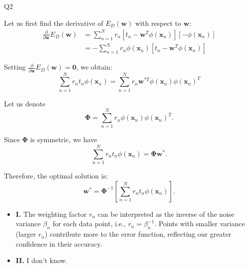 \question Q2\droppoints

\begin{solution}
     Let us first find the derivative of $E_D(\mathbf{w})$ with respect to $\mathbf{w}$:
    \begin{align*}
        \frac{\partial}{\partial \mathbf{w}} E_D(\mathbf{w})
        &= \sum_{n = 1}^{N} r_n \left[ t_n - \mathbf{w}^T\phi(\mathbf{x}_n) \right] \left[ -\phi(\mathbf{x}_n) \right] \\[0.5em]
        &= -\sum_{n = 1}^{N} r_n \phi(\mathbf{x}_n) \left[ t_n - \mathbf{w}^T\phi(\mathbf{x}_n) \right]
    \end{align*}

    Setting $\frac{\partial}{\partial \mathbf{w}}E_D(\mathbf{w}) = \mathbf{0}$, we obtain:
    \[
        \sum_{n = 1}^{N} r_n t_n \phi(\mathbf{x}_n)
        = \sum_{n = 1}^{N} r_n \mathbf{w}^{*T} \phi(\mathbf{x}_n) \phi(\mathbf{x}_n)^T
    \]

    Let us denote
    \[
        \bm{\Phi} = \sum_{n = 1}^{N} r_n \phi(\mathbf{x}_n) \phi(\mathbf{x}_n)^T.
    \]

    Since $\bm{\Phi}$ is symmetric, we have
    \[
        \sum_{n = 1}^{N} r_n t_n \phi(\mathbf{x}_n) = \bm{\Phi} \mathbf{w}^*.
    \]

    Therefore, the optimal solution is:
    \[
        \mathbf{w}^* = \bm{\Phi}^{-1} \left[ \sum_{n = 1}^{N} r_n t_n \phi(\mathbf{x}_n) \right].
    \]

    \begin{itemize}
        \item { \textbf{I.}
        The weighting factor $r_n$ can be interpreted as the inverse of the noise variance $\beta_n$ for each data point, i.e., $r_n = \beta_n^{-1}$.
        Points with smaller variance (larger $r_n$) contribute more to the error function, reflecting our greater confidence in their accuracy.
        }
        \item { \textbf{II.} I don't know. }
    \end{itemize}
\end{solution}
